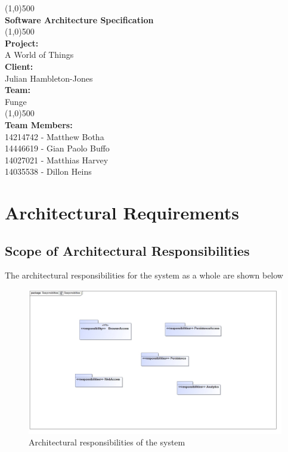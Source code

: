 \documentclass{article}
\begin{document}
\begin{titlepage}
	\begin{center}
		\line(1,0){500}\\
		[6mm]
		\huge{\bfseries Software Architecture Specification}\\
		\line(1,0){500}\\
		[5mm]
		\large\textbf{Project:}\\A World of Things\\
		[3mm]
		\large\textbf{Client:}\\Julian Hambleton-Jones\\
		[3mm]
		\large \textbf{Team:}\\Funge\\
		\line(1,0){500}\\
		[5mm]
		\large \textbf{Team Members:}\\
		[3mm]
		\large 14214742 - Matthew Botha\\
		\large 14446619 - Gian Paolo Buffo\\
		\large 14027021 - Matthias Harvey\\
        \large 14035538 - Dillon Heins\\[3mm]
	\end{center}
\end{titlepage}

\cleardoublepage
\thispagestyle{empty}
\tableofcontents
\cleardoublepage
\setcounter{page}{1}

\section{Architectural Requirements}
\subsection{Scope of Architectural Responsibilities}
The architectural responsibilities for the system as a whole are shown below
\begin{figure}[H]
	\centering
	\includegraphics[width=\textwidth]{Responsibilities.jpg}
	\caption{Architectural responsibilities of the system}
\end{figure}
\end{document}
